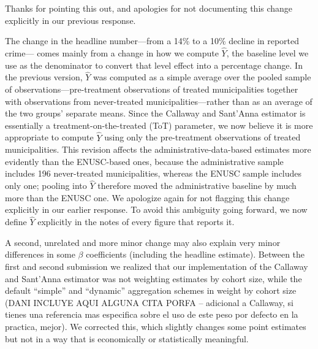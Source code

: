 

Thanks for pointing this out, and apologies for not documenting this change explicitly in our previous response.

The change in the headline number---from a 14\% to a 10\% decline in reported crime--- comes mainly from a change in how we compute $\hat{Y}$, the baseline level we use as the denominator to convert that level effect into a percentage change. In the previous version, $\hat{Y}$ was computed as a simple average over the pooled sample of observations---pre-treatment observations of treated municipalities together with observations from never-treated municipalities---rather than as an average of the two groups' separate means. Since the Callaway and Sant'Anna estimator is essentially a treatment-on-the-treated (ToT) parameter, we now believe it is more appropriate to compute $\hat{Y}$ using only the pre-treatment observations of treated municipalities. This revision affects the administrative-data-based estimates more evidently than the ENUSC-based ones, because the administrative sample includes 196 never-treated municipalities, whereas the ENUSC sample includes only one; pooling into $\hat{Y}$ therefore moved the administrative baseline by much more than the ENUSC one. We apologize again for not flagging this change explicitly in our earlier response. To avoid this ambiguity going forward, we now define $\hat{Y}$ explicitly in the notes of every figure that reports it.

A second, unrelated and more minor change may also explain very minor differences in some $\beta$ coefficients (including the headline estimate). Between the first and second submission we realized that our implementation of the Callaway and Sant'Anna estimator was not weighting estimates by cohort size, while the default ``simple'' and ``dynamic'' aggregation schemes in \citet{Callaway} weight by cohort size (DANI INCLUYE AQUI ALGUNA CITA PORFA -- adicional a Callaway, si tienes una referencia mas especifica sobre el uso de este peso por defecto en la practica, mejor). We corrected this, which slightly changes some point estimates but not in a way that is economically or statistically meaningful.




